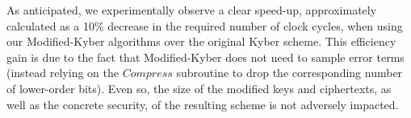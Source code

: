 As anticipated, we experimentally observe a clear speed-up, approximately calculated as a 10\%  decrease in the required number of clock cycles, when using our Modified-Kyber algorithms over the original Kyber scheme. This efficiency gain is due to the fact that Modified-Kyber does not need to sample error terms (instead relying on the $Compress$ subroutine to drop the corresponding number of lower-order bits). Even so, the size of the modified keys and ciphertexts, as well as the concrete security, of the resulting scheme is not adversely impacted.

